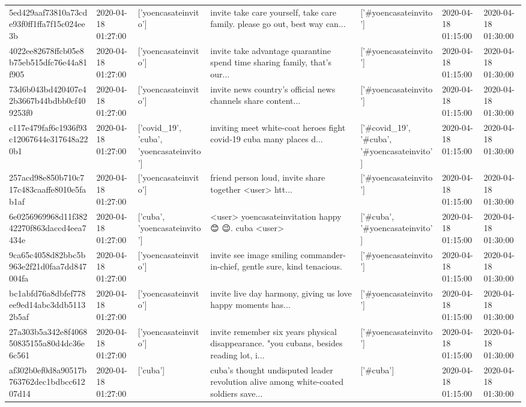 \begin{tabular}{lllllll}
5ed429aaf73810a73cde93f0ff1ffa7f15c024ee3b & 2020-04-18 01:27:00 & ['yoencasateinvito'] & invite take care yourself, take care family. please go out, best way can... & ['#yoencasateinvito'] & 2020-04-18 01:15:00 & 2020-04-18 01:30:00 \\
4022ee82678ffcb05e8b75eb515dfc76e44a81f905 & 2020-04-18 01:27:00 & ['yoencasateinvito'] & invite take advantage quarantine spend time sharing family, that's our... & ['#yoencasateinvito'] & 2020-04-18 01:15:00 & 2020-04-18 01:30:00 \\
73d6b043bd420407e42b3667b44bdbb0cf409253f0 & 2020-04-18 01:27:00 & ['yoencasateinvito'] & invite news country's official news channels share content... & ['#yoencasateinvito'] & 2020-04-18 01:15:00 & 2020-04-18 01:30:00 \\
c117e479faf6c1936f93c12067644e317648a220b1 & 2020-04-18 01:27:00 & ['covid_19', 'cuba', 'yoencasateinvito'] & inviting meet white-coat heroes fight covid-19 cuba many places d... & ['#covid_19', '#cuba', '#yoencasateinvito'] & 2020-04-18 01:15:00 & 2020-04-18 01:30:00 \\
257acd98e850b710c717c483caaffe8010e5fab1af & 2020-04-18 01:27:00 & ['yoencasateinvito'] & friend person loud, invite share together <user> htt... & ['#yoencasateinvito'] & 2020-04-18 01:15:00 & 2020-04-18 01:30:00 \\
6e0256969968d11f38242270f863daccd4eea7434e & 2020-04-18 01:27:00 & ['cuba', 'yoencasateinvito'] & <user> yoencasateinvitation happy 😊 😉. cuba <user> & ['#cuba', '#yoencasateinvito'] & 2020-04-18 01:15:00 & 2020-04-18 01:30:00 \\
9ca65c4058d82bbc5b963e2f21d0faa7dd847004fa & 2020-04-18 01:27:00 & ['yoencasateinvito'] & invite see image smiling commander-in-chief, gentle sure, kind tenacious. & ['#yoencasateinvito'] & 2020-04-18 01:15:00 & 2020-04-18 01:30:00 \\
bc1abfd76a8dbfef778ee9ed14abc3ddb51132b5af & 2020-04-18 01:27:00 & ['yoencasateinvito'] & invite live day harmony, giving us love happy moments has... & ['#yoencasateinvito'] & 2020-04-18 01:15:00 & 2020-04-18 01:30:00 \\
27a303b5a342e8f406850835155a80d4dc36e6c561 & 2020-04-18 01:27:00 & ['yoencasateinvito'] & invite remember six years physical disappearance. "you cubans, besides reading lot, i... & ['#yoencasateinvito'] & 2020-04-18 01:15:00 & 2020-04-18 01:30:00 \\
af302b0ef0d8a90517b763762dec1bdbcc61207d14 & 2020-04-18 01:27:00 & ['cuba'] & cuba's thought undisputed leader revolution alive among white-coated soldiers save... & ['#cuba'] & 2020-04-18 01:15:00 & 2020-04-18 01:30:00 \\

\end{tabular}
